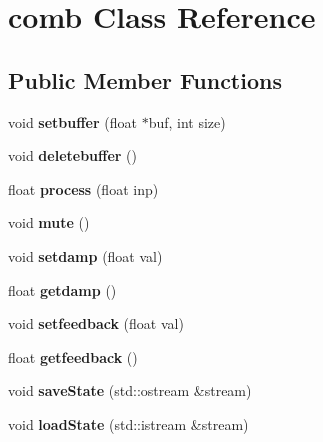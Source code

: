 \hypertarget{classcomb}{\section{comb Class Reference}
\label{classcomb}
}
\subsection*{Public Member Functions}
\begin{DoxyCompactItemize}
\item 
\hypertarget{classcomb_a000d3f031781c27ceaf487a1ec957fec}{void {\bfseries setbuffer} (float $\ast$buf, int size)}\label{classcomb_a000d3f031781c27ceaf487a1ec957fec}

\item 
\hypertarget{classcomb_a4dd1f6c7ae8cf781c26599d8e023d41d}{void {\bfseries deletebuffer} ()}\label{classcomb_a4dd1f6c7ae8cf781c26599d8e023d41d}

\item 
\hypertarget{classcomb_a0d4801f6d16411a2f63ff1a25d2fe5fb}{float {\bfseries process} (float inp)}\label{classcomb_a0d4801f6d16411a2f63ff1a25d2fe5fb}

\item 
\hypertarget{classcomb_ae18d1b1ea26d1c18087d3d8feeb7145d}{void {\bfseries mute} ()}\label{classcomb_ae18d1b1ea26d1c18087d3d8feeb7145d}

\item 
\hypertarget{classcomb_abd0aa594882431e7f7eb4901fcc0ea5e}{void {\bfseries setdamp} (float val)}\label{classcomb_abd0aa594882431e7f7eb4901fcc0ea5e}

\item 
\hypertarget{classcomb_a99e2c5952a08d006902f5e20a05d37a7}{float {\bfseries getdamp} ()}\label{classcomb_a99e2c5952a08d006902f5e20a05d37a7}

\item 
\hypertarget{classcomb_ad8fac09822db8d944c13791112b5b6a2}{void {\bfseries setfeedback} (float val)}\label{classcomb_ad8fac09822db8d944c13791112b5b6a2}

\item 
\hypertarget{classcomb_a1df81e7e8f9310831e4e7929078f1d11}{float {\bfseries getfeedback} ()}\label{classcomb_a1df81e7e8f9310831e4e7929078f1d11}

\item 
\hypertarget{classcomb_ab6b7006d95b9b1d9397dbf9c22d8a981}{void {\bfseries save\-State} (std\-::ostream \&stream)}\label{classcomb_ab6b7006d95b9b1d9397dbf9c22d8a981}

\item 
\hypertarget{classcomb_a4accb964763281cf365e24fb2b1c70ec}{void {\bfseries load\-State} (std\-::istream \&stream)}\label{classcomb_a4accb964763281cf365e24fb2b1c70ec}

\end{DoxyCompactItemize}


